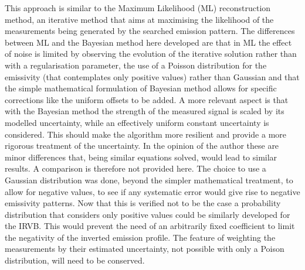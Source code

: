 This approach is similar to the Maximum Likelihood (ML) reconstruction method, an iterative method that aims at maximising the likelihood of the measurements being generated by the searched emission pattern.\cite{Craciunescu2008,Craciunescu2018} The differences between ML and the Bayesian method here developed are that in ML the effect of noise is limited by observing the evolution of the iterative solution rather than with a regularisation parameter, the use of a Poisson distribution for the emissivity (that contemplates only positive values) rather than Gaussian and that the simple mathematical formulation of Bayesian method allows for specific corrections like the uniform offsets to be added. A more relevant aspect is that with the Bayesian method the strength of the measured signal is scaled by its modelled uncertainty, while an effectively uniform constant uncertainty is considered. This should make the algorithm more resilient and provide a more rigorous treatment of the uncertainty. In the opinion of the author these are minor differences that, being similar equations solved, would lead to similar results. A comparison is therefore not provided here. The choice to use a Gaussian distribution was done, beyond the simpler mathematical treatment, to allow for negative values, to see if any systematic error would give rise to negative emissivity patterns. Now that this is verified not to be the case a probability distribution that considers only positive values could be similarly developed for the IRVB. This would prevent the need of an arbitrarily fixed coefficient to limit the negativity of the inverted emission profile. The feature of weighting the measurements by their estimated uncertainty, not possible with only a Poison distribution, will need to be conserved.

